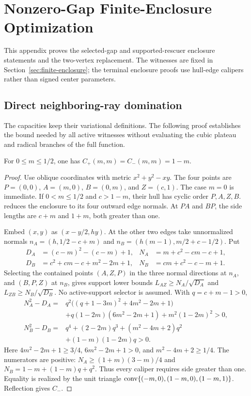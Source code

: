 \section{Nonzero-Gap Finite-Enclosure Optimization}
\label{sec:nonzero-gap-finite-enclosure-optimization}

This appendix proves the selected-gap and supported-rescuer enclosure
statements and the two-vertex replacement. The witnesses are fixed in
Section~\ref{sec:finite-enclosure}; the terminal enclosure proofs use hull-edge calipers rather than signed center parameters.


\subsection{Direct neighboring-ray domination}
\label{subsec:new-neighbor-ray-capacity}

The capacities keep their variational definitions. The following proof
establishes the bound needed by all active witnesses without evaluating
the cubic plateau and radical branches of the full function.


\begin{lemma}
\label{lem:direct-neighbor-diagonal}
For $0\le m\le1/2$, one has $C_+(m,m)=C_-(m,m)=1-m$.
\end{lemma}
\begin{proof}
Use oblique coordinates with metric $x^2+y^2-xy$. The four points are
$P=(0,0)$, $A=(m,0)$, $B=(0,m)$, and $Z=(c,1)$. The case $m=0$
is immediate. If $0<m\le1/2$ and $c>1-m$, their hull has cyclic order
$P,A,Z,B$.  reduces the enclosure to its four outward
edge normals. At $PA$ and $BP$, the side lengths are $c+m$ and $1+m$,
both greater than one.

Embed $(x,y)$ as $(x-y/2,hy)$. At the other two edges take unnormalized
normals $n_A=(h,1/2-c+m)$ and $n_B=(h(m-1),m/2+c-1/2)$. Put
\[
\begin{aligned}
 D_A&=(c-m)^2-(c-m)+1,&N_A&=m+c^2-cm-c+1,\\
 D_B&=c^2+cm-c+m^2-2m+1,&N_B&=cm+c^2-c-m+1.
\end{aligned}
\]
Selecting the contained points $(A,Z,P)$ in the three normal directions
at $n_A$, and $(B,P,Z)$ at $n_B$, gives support lower bounds
$L_{AZ}\ge N_A/\sqrt{D_A}$ and $L_{ZB}\ge N_B/\sqrt{D_B}$.
No active-support selector is assumed. With $q=c+m-1>0$,
\[
\begin{aligned}
 N_A^2-D_A={}&q^2\big((q+1-3m)^2+4m^2-2m+1\big)\\
 &+q(1-2m)(6m^2-2m+1)+m^2(1-2m)^2>0,\\
 N_B^2-D_B={}&q^4+(2-2m)q^3+(m^2-4m+2)q^2\\
 &+(1-m)(1-2m)q>0.
\end{aligned}
\]
Here $4m^2-2m+1\ge3/4$, $6m^2-2m+1>0$, and
$m^2-4m+2\ge1/4$. The numerators are positive:
$N_A\ge(1+m)(3-m)/4$ and $N_B=1-m+(1-m)q+q^2$.
Thus every caliper requires side greater than one.
Equality is realized by the unit triangle
$\mathrm{conv}\{(-m,0),(1-m,0),(1-m,1)\}$. Reflection gives $C_-$.
\end{proof}




